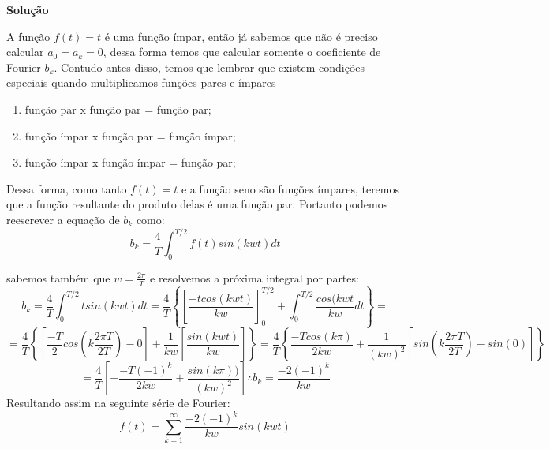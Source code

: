 \linespread{1.5}

\textbf{Solução}

A função $f(t) = t$ é uma função ímpar, então já sabemos que não é preciso calcular $a_0 = a_k = 0$, dessa forma temos que calcular somente o coeficiente de Fourier $b_k$. Contudo antes disso, temos que lembrar que existem condições especiais quando multiplicamos funções pares e ímpares
\begin{enumerate}[i]
    \item função par x função par = função par;
    \item função ímpar x função par = função ímpar;
    \item função ímpar x função ímpar = função par;
\end{enumerate}

Dessa forma, como tanto $f(t) = t$ e a função seno são funções ímpares, teremos que a função resultante do produto delas é uma função par. Portanto podemos reescrever a equação de $b_k$ como:
\begin{equation*}
    b_k = \frac{4}{T}\int_0^{T/2} f(t)sin(kwt)dt
\end{equation*}

sabemos também que $w=\frac{2\pi}{T}$ e resolvemos a próxima integral por partes:
\begin{equation*}
    b_k = \frac{4}{T}\int_0^{T/2} tsin(kwt)dt = \frac{4}{T}\left\{\left[\frac{-tcos(kwt)}{kw}\right]^{T/2}_0 + \int^{T/2}_0 \frac{cos(kwt}{kw}dt\right\} = 
\end{equation*}
\begin{equation*}
     = \frac{4}{T}\left\{\left[\frac{-T}{2}cos(k\frac{2\pi T}{2T}) - 0 \right]+ \frac{1}{kw}\left[\frac{sin(kwt)}{kw}\right]\right\} = \frac{4}{T}\left\{\frac{-Tcos(k\pi)}{2kw}+\frac{1}{(kw)^2}\left[sin(k\frac{2\pi T}{2T}) - sin(0)\right]\right\}
\end{equation*}
\begin{equation*}
    = \frac{4}{T}\left[-\frac{-T(-1)^k}{2kw} + \frac{sin(k\pi))}{(kw)^ 2}\right] \therefore b_k = \frac{-2(-1)^k}{kw}
\end{equation*}
Resultando assim na seguinte série de Fourier:
\begin{equation*}
    \boxed{ f(t) = \sum_{k=1}^\infty \frac{-2(-1)^k}{kw}sin(kwt) }
\end{equation*}